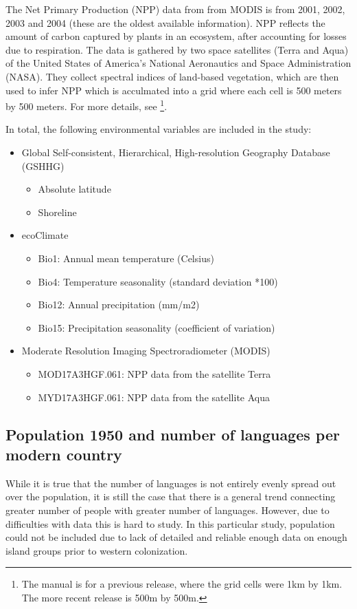 \documentclass[a4paper,10pt]{article} %
\begin{document}
The Net Primary Production (NPP) data from from MODIS is from 2001, 2002, 2003 and 2004 (these are the oldest available information). NPP reflects the amount of carbon captured by plants in an ecosystem, after accounting for losses due to respiration. The data is gathered by two space satellites (Terra and Aqua) of the United States of America's National Aeronautics and Space Administration (NASA). They collect spectral indices of land-based vegetation, which are then used to infer NPP which is acculmated into a grid where each cell is 500 meters by 500 meters. For more details, see \citet{running2015daily} \footnote{The manual is for a previous release, where the grid cells were 1km by 1km. The more recent release is 500m by 500m.}.

In total, the following environmental variables are included in the study:

\begin{itemize}
\item Global Self-consistent, Hierarchical, High-resolution Geography Database (GSHHG)
\begin{itemize}
    \item Absolute latitude
    \item Shoreline
\end{itemize}
\item ecoClimate
\begin{itemize}
\item Bio1: Annual mean temperature (Celsius)
\item Bio4: Temperature seasonality (standard deviation *100)
\item Bio12: Annual precipitation (mm/m2)
\item Bio15: Precipitation seasonality (coefficient of variation)
\end{itemize}
\item Moderate Resolution Imaging Spectroradiometer (MODIS)
\begin{itemize}
    \item MOD17A3HGF.061: NPP data from the satellite Terra
    \item MYD17A3HGF.061: NPP data from the satellite Aqua
\end{itemize}
\end{itemize}


\FloatBarrier
\newpage
\subsection{Population 1950 and number of languages per modern country}
\label{appendix_pop_vs_languages}
While it is true that the number of languages is not entirely evenly spread out over the population, it is still the case that there is a general trend connecting greater number of people with greater number of languages. However, due to difficulties with data this is hard to study. In this particular study, population could not be included due to lack of detailed and reliable enough data on enough island groups prior to western colonization.
\end{document}
